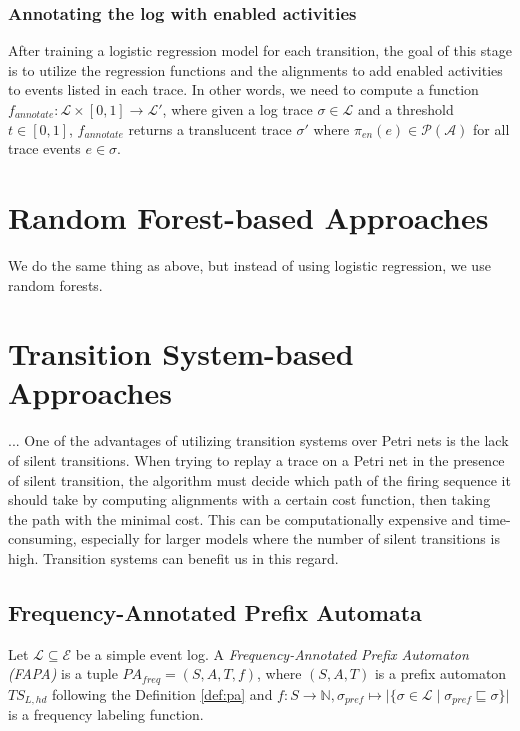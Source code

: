 \subsubsection*{Annotating the log with enabled activities}

After training a logistic regression model for each transition, the goal of this stage is to utilize the regression functions and the alignments to add enabled activities to events listed in each trace. In other words, we need to compute a function $f_{annotate} \colon \mathcal{L} \times [0, 1] \rightarrow \mathcal{L'}$, where given a log trace $\sigma \in \mathcal{L}$ and a threshold $t \in [0, 1]$, $f_{annotate}$ returns a translucent trace $\sigma'$ where $\pi_{en}(e) \in \mathcal{P(\mathcal{A})}$ for all trace events $e \in \sigma$.

\section{Random Forest-based Approaches}

We do the same thing as above, but instead of using logistic regression, we use random forests.

\section{Transition System-based Approaches}

... One of the advantages of utilizing transition systems over Petri nets is the lack of silent transitions. When trying to replay a trace on a Petri net in the presence of silent transition, the algorithm must decide which path of the firing sequence it should take by computing alignments with a certain cost function, then taking the path with the minimal cost. This can be computationally expensive and time-consuming, especially for larger models where the number of silent transitions is high. Transition systems can benefit us in this regard.

\subsection{Frequency-Annotated Prefix Automata}

\begin{definition}
    Let $\mathcal{L} \subseteq \mathcal{E}$ be a simple event log. A \emph{Frequency-Annotated Prefix Automaton (FAPA)} is a tuple $\mathit{PA}_{freq} = (S, A, T, f)$, where $(S, A, T)$ is a prefix automaton $\mathit{TS}_{L, hd}$ following the Definition \ref{def:pa} and  $f \colon S \to \mathbb{N}, \sigma_{pref} \mapsto \lvert \{ \sigma \in \mathcal{L} \mid \sigma_{pref} \sqsubseteq \sigma \}\rvert$ is a frequency labeling function.
\end{definition}

